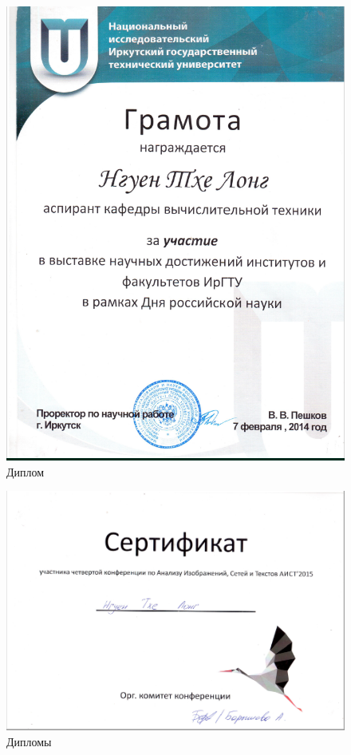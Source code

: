 \begin{figure}[ht!]
\centering
\includegraphics [scale=0.7] {images/p27.png}
\begin{center}
\caption{Диплом}\label{imgp27}
\end{center}
\end{figure}

\begin{figure}[ht!]
\centering
\includegraphics [scale=0.7] {images/p28.png}
\begin{center}
\caption{Дипломы}\label{imgp28}
\end{center}
\end{figure}

